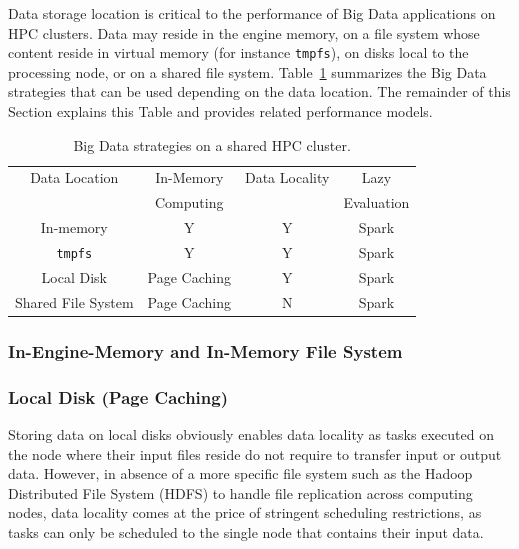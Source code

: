 \documentclass{IEEEtran}
\begin{document}
Data storage location is critical to the performance of Big Data 
applications on HPC clusters. Data may reside in the engine memory, on 
a file system whose content reside in virtual memory (for instance 
\texttt{tmpfs}), on disks local to the processing node, or on a shared 
file system. Table~\ref{table:features} summarizes the Big Data 
strategies that can be used depending on the data location. The 
remainder of this Section explains this Table and provides related 
performance models.
\begin{table}
\centering
\begin{tabular}{c|ccc}
   \rowcolor{headcolor}
    Data Location                 & In-Memory     & Data Locality & Lazy \\
    \rowcolor{headcolor}
                                  & Computing     &               & Evaluation      \\
                                  \hline          
In-memory                         &   Y           & Y             & Spark               \\
\texttt{tmpfs}                    &   Y           & Y             & Spark           \\
Local Disk                        & Page Caching  & Y             & Spark           \\
Shared File System                & Page Caching  & N            & Spark          
\end{tabular}
\caption{Big Data strategies on a shared HPC cluster.}
\label{table:features}
\end{table}

\subsubsection{In-Engine-Memory and In-Memory File System} 



\subsubsection{Local Disk (Page Caching)} %





Storing data on local disks obviously enables data locality as tasks 
executed on the node where their input files reside do not require to 
transfer input or output data. However, in absence of a more specific 
file system such as the Hadoop Distributed File System (HDFS) to handle 
file replication across computing nodes, data locality comes at the price
of stringent scheduling restrictions, as tasks can only be scheduled to the
single node that contains their input data.
\end{document}
